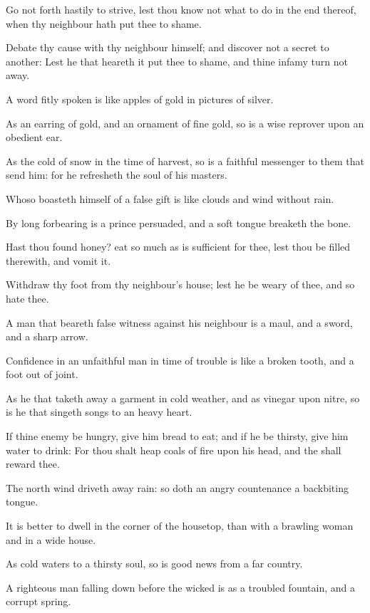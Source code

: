 \verse Go not forth hastily to strive, lest thou know not what to do in the end thereof, when thy neighbour hath put thee to shame.

\verse Debate thy cause with thy neighbour himself; and discover not a secret to another: \verse Lest he that heareth it put thee to shame, and thine infamy turn not away.

\verse A word fitly spoken is like apples of gold in pictures of silver.

\verse As an earring of gold, and an ornament of fine gold, so is a wise reprover upon an obedient ear.

\verse As the cold of snow in the time of harvest, so is a faithful messenger to them that send him: for he refresheth the soul of his masters.

\verse Whoso boasteth himself of a false gift is like clouds and wind without rain.

\verse By long forbearing is a prince persuaded, and a soft tongue breaketh the bone.

\verse Hast thou found honey? eat so much as is sufficient for thee, lest thou be filled therewith, and vomit it.

\verse Withdraw thy foot from thy neighbour's house; lest he be weary of thee, and so hate thee.

\verse A man that beareth false witness against his neighbour is a maul, and a sword, and a sharp arrow.

\verse Confidence in an unfaithful man in time of trouble is like a broken tooth, and a foot out of joint.

\verse As he that taketh away a garment in cold weather, and as vinegar upon nitre, so is he that singeth songs to an heavy heart.

\verse If thine enemy be hungry, give him bread to eat; and if he be thirsty, give him water to drink: \verse For thou shalt heap coals of fire upon his head, and the \LORD shall reward thee.

\verse The north wind driveth away rain: so doth an angry countenance a backbiting tongue.

\verse It is better to dwell in the corner of the housetop, than with a brawling woman and in a wide house.

\verse As cold waters to a thirsty soul, so is good news from a far country.

\verse A righteous man falling down before the wicked is as a troubled fountain, and a corrupt spring.

